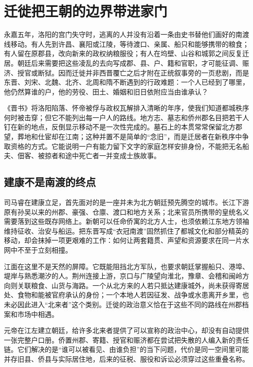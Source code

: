 \section{迁徙把王朝的边界带进家门}
\label{sec:synthesis-migration-households}

永嘉五年，洛阳的宫门失守时，逃离的人并没有沿着一条由史书替他们画好的南渡线移动。有人先到许昌、襄阳或江陵，等待渡口、亲属、船只和能够携带的粮食；有人留在原郡县，改向新来的政权纳粮服役；有人在坞壁、山谷和城郭之间反复迁居。朝廷后来需要把这些凌乱的去向写成郡、县、户、籍和官职，才可能征调、赈济、授官或断狱。因而迁徙并非西晋覆亡之后才附在正统叙事旁的一页悲剧，而是东晋、刘宋、北魏、北齐、北周和隋不断遇到的行政难题：一个人已经到了哪里，他仍然算谁的户，他的劳役、田土、婚姻和旧日依附应当由谁承认？

《晋书》将洛阳陷落、怀帝被俘与政权瓦解排入清晰的年序，使我们知道都城秩序何时被击穿；但它不能列出每一户人的路线。地方志、墓志和侨州郡名目把若干人钉在新的地点，反倒显示移动不是一次性完成的。墓石上的本贯常常保留北方郡望，葬地和仕宦却在江南；这种并置不是简单的“念旧”，而是迁居者在新秩序中争取资格的方式。它能说明一户有能力留下文字的家庭怎样安排身份，不能把无名船夫、佃客、被掠者和途中死亡者一并变成士族故事。

\subsection{建康不是南渡的终点}

司马睿在建康立足，首先面对的是一座并未为北方朝廷预先腾空的城市。长江下游原有孙吴以来的州郡、豪强、仓廪、渡口和地方关系；北来官员所携带的皇统名义需要落到这些既存网络上。新朝可以任命侨寓的北方人士，也须依赖江东地方领袖维持征收、治安与船运。把东晋写成“衣冠南渡”固然抓住了都城文化和部分精英的移动，却会抹掉一项更艰难的工作：如何让两套籍贯、声望和资源要求在同一片水网中不至于立刻相撞。

江面在这里不是天然的屏障。它既能阻挡北方军队，也要求朝廷掌握船只、港埠、堤岸与熟悉潮汐的人。荆州连接上游，京口与广陵望向淮北，豫章、会稽和闽岭方向则关联粮食、山货与海路。一个从北方来的人若只抵达建康城外，尚未获得寄居处、食物和能被官府承认的身份；一个本地人若因征发、战争或水患离开乡里，也未必因此进入“北来者”这个类别。迁徙的政治意义恰在于这些不同的路线在州郡档案和市场中相遇。

\begin{turningpoint}
元帝在江左建立朝廷，给许多北来者提供了可以宣称的政治中心，却没有自动提供一张完整户口册。侨置州郡、寄籍、授官和赈济都在尝试把失散的人编入新的责任链。它们解决的是“谁可以被看见、由谁负担”的当下问题，代价是同一空间里可能并存旧县、侨县与实际居住地，后来的征税、服役和诉讼必须穿过这些重叠名称。
\end{turningpoint}

